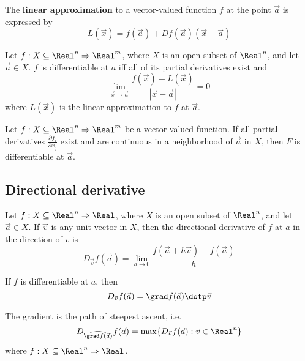 \begin{definition}
  The \textbf{linear approximation} to a vector-valued function $f$ at the point $\vec{a}$ is expressed by
  \[
    L(\vec{x}) = f(\vec{a}) + Df(\vec{a})(\vec{x} - \vec{a})
  \]
\end{definition}

\begin{definition}[Differentiability]
  Let $f : X \subseteq \Real^n \Rightarrow \Real^m$, where $X$ is an open subset of $\Real^n$, and let $\vec{a} \in X$. $f$ is differentiable at $a$ iff all of its partial derivatives exist and 
  \[
    \lim_{\vec{x} \to \vec{a}} \frac{f(\vec{x}) - L(\vec{x})}{|\vec{x} - \vec{a}|} = 0
  \]
  where $L(\vec{x})$ is the linear approximation to $f$ at $\vec{a}$.
\end{definition}

\begin{theorem}
  Let $f : X \subseteq \Real^n \Rightarrow \Real^m$ be a vector-valued function. If all partial derivatives $\frac{\partial f_i}{\partial x_j}$ exist and are continuous in a neighborhood of $\vec{a}$ in $X$, then $F$ is differentiable at $\vec{a}$.
\end{theorem}

\subsection{Directional derivative}


\begin{definition}
  Let $f : X \subseteq \Real^n \Rightarrow \Real$, where $X$ is an open subset of $\Real^n$, and let $\vec{a} \in X$. If $\vec{v}$ is any unit vector in $X$, then the directional derivative of $f$ at $a$ in the direction of $v$ is
  \[
    D_{\vec{v}} f(\vec{a}) = \lim_{h \to 0} \frac{f(\vec{a} + h\vec{v}) - f(\vec{a})}{h}
  \]
\end{definition}

\begin{theorem}
  If $f$ is differentiable at $a$, then
  \[
    D_{\vec{v}} f(\vec{a}) = \grad f(\vec{a}) \dotp \vec{v}
  \]
\end{theorem}

\begin{theorem}
  The gradient is the path of steepest ascent, i.e.
  \[
    D_{\widehat{\grad f(\vec{a})}} f(\vec{a}) = \max \{ D_{\vec{v}} f(\vec{a}) : \vec{v} \in \Real^n \}
  \]
  where $f : X \subseteq \Real^n \Rightarrow \Real$.
\end{theorem}

